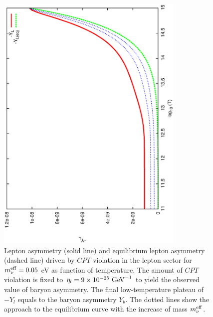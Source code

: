 \documentclass[12pt]{revtex4}
\newcommand{\meff}{m^{\rm eff}_\nu}
\newcommand{\GeV}{{\rm GeV}}
\begin{document}
\begin{figure}
\includegraphics[width=9cm,angle=270]{l_dom_asymm_bau.ps}
\caption{
	Lepton asymmetry (solid line) and equilibrium lepton asymmetry (dashed line) 
driven by $CPT$ violation in the lepton sector
    for $\meff=0.05$ eV as function of temperature.
	The amount of $CPT$ violation is fixed to $ \eta_l = 9 \times 10^{-25}~\GeV^{-1} $ 
	to yield the observed value of baryon asymmetry.
	The final low-temperature plateau of $-Y_l$ equals to the baryon asymmetry $Y_b$. 
	The dotted lines show the approach to the equilibrium curve with the increase of
	mass $ \meff $.
	}
\label{l_dom_asymm_bau}
\end{figure}
\end{document}
